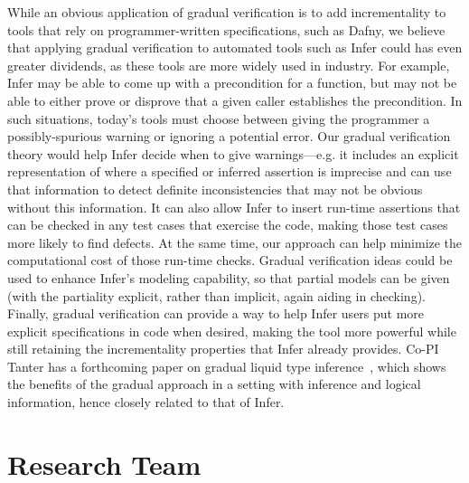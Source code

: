 \documentclass[10pt,twocolumn]{article}
\begin{document}
\begin{sloppypar}
While an obvious application of gradual verification is to add incrementality to tools that rely on programmer-written specifications, such as Dafny, we believe that applying gradual verification to automated tools such as Infer could has even greater dividends, as these tools are more widely used in industry. For example, Infer may be able to come up with a precondition for a function, but may not be able to either prove or disprove that a given caller establishes the precondition.  In such situations, today's tools must choose between giving the programmer a possibly-spurious warning or ignoring a potential error. Our gradual verification theory would help Infer decide when to give warnings---e.g. it includes an explicit representation of where a specified or inferred assertion is imprecise and can use that information to detect definite inconsistencies that may not be obvious without this information. It can also allow Infer to insert run-time assertions that can be checked in any test cases that exercise the code, making those test cases more likely to find defects.  At the same time, our approach can help minimize the computational cost of those run-time checks. Gradual verification ideas could be used to enhance Infer's modeling capability, so that partial models can be given (with the partiality explicit, rather than implicit, again aiding in checking). Finally, gradual verification can provide a way to help Infer users put more explicit specifications in code when desired, making the tool more powerful while still retaining the incrementality properties that Infer already provides.
Co-PI Tanter has a forthcoming paper on gradual liquid type inference~\cite{vazouAl:oopsla2018}, which shows the benefits of the gradual approach in a setting with inference and logical information, hence closely related to that of Infer.

\section{Research Team}
\vspace{-2ex}


\end{sloppypar}
\end{document}
